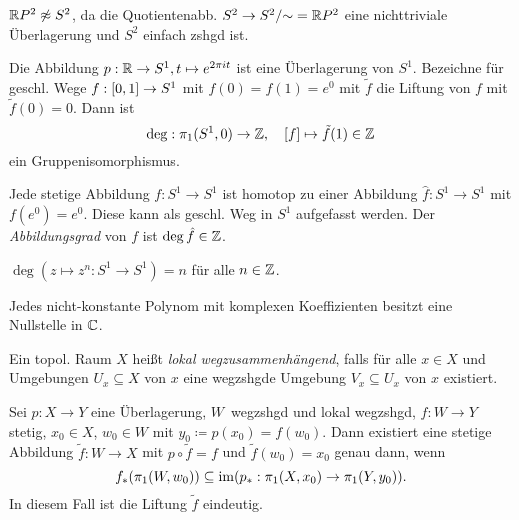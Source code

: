 \documentclass{cheat-sheet}
\begin{document}
\begin{kor}
  $\mathbb{R} P^2 \not\approx S^2$, da die Quotientenabb. $S^2 \to S^2/{\sim} = \mathbb{R} P^2$ eine nichttriviale Überlagerung und $S^2$ einfach zshgd ist.
\end{kor}

\begin{prop}
  Die Abbildung $p : \mathbb{R} \to S^1, t \mapsto e^{2 \pi i t}$ ist eine Überlagerung von $S^1$. Bezeichne für geschl. Wege $f : \left[ 0, 1 \right] \to S^1$ mit $f(0) = f(1) = e^0$ mit $\tilde{f}$ die Liftung von $f$ mit $\tilde{f}(0) = 0$. Dann ist
  \[ \mathrm{deg} : \pi_1(S^1, 0) \to \mathbb{Z}, \quad [f] \mapsto \tilde{f}(1) \in \mathbb{Z} \]
  ein Gruppenisomorphismus.
\end{prop}

\begin{defn}
  Jede stetige Abbildung $f : S^1 \to S^1$ ist homotop zu einer Abbildung $\hat{f} : S^1 \to S^1$ mit $f(e^0) = e^0$. Diese kann als geschl. Weg in $S^1$ aufgefasst werden. Der \emph{Abbildungsgrad} von $f$ ist $\deg \hat{f} \in \mathbb{Z}$.
\end{defn}

\begin{prop}
  $\deg(z \mapsto z^n : S^1 \to S^1) = n$ für alle $n \in \mathbb{Z}$.
\end{prop}



\begin{kor}
  Jedes nicht-konstante Polynom mit komplexen Koeffizienten besitzt eine Nullstelle in $\mathbb{C}$.
\end{kor}


\begin{defn}
  Ein topol. Raum $X$ heißt \emph{lokal wegzusammenhängend}, falls für alle $x \in X$ und Umgebungen $U_x \subseteq X$ von $x$ eine wegzshgde Umgebung $V_x \subseteq U_x$ von $x$ existiert.
\end{defn}

\begin{satz}
  Sei $p : X \to Y$ eine Überlagerung, $W$~wegzshgd und lokal wegzshgd, $f : W \to Y$ stetig, $x_0 \in X$, $w_0 \in W$ mit $y_0 \coloneqq p(x_0) = f(w_0)$. Dann existiert eine stetige Abbildung $\tilde{f} : W \to X$ mit $p \circ \tilde{f} = f$ und $\tilde{f}(w_0) = x_0$ genau dann, wenn
  \[ f_*(\pi_1(W, w_0)) \subseteq \operatorname{im} (p_* : \pi_1(X, x_0) \to \pi_1(Y, y_0)). \]
  In diesem Fall ist die Liftung $\tilde{f}$ eindeutig.
\end{satz}
\end{document}
